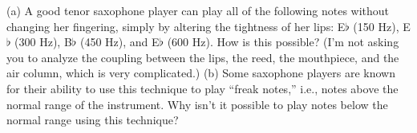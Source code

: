 (a) A good tenor saxophone player can play all of the
following notes without changing her fingering, simply by
altering the tightness of her lips: E$\flat$ (150 Hz), E$\flat$ (300
Hz), B$\flat$ (450 Hz), and E$\flat$ (600 Hz).  How is this possible?
(I'm not asking you to analyze the coupling between the lips, the
reed, the mouthpiece, and the air column, which is very complicated.)\hwendpart
(b) Some saxophone players are known for their ability to
use this technique to play ``freak notes,'' i.e., notes above
the normal range of the instrument.  Why isn't it possible
to play notes below the normal range using this technique?
